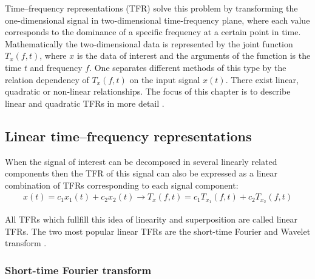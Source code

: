 Time–frequency representations (TFR) solve this problem by transforming the one-dimensional signal in two-dimensional time-frequency plane, where each value corresponds to the dominance of a specific frequency at a certain point in time. Mathematically the two-dimensional data is represented by the joint function $T_{x}(f,t)$, where $x$ is the data of interest and the arguments of the function is the time  $t$ and frequency  $f$. One separates different methods of this type by the relation dependency of $T_{x}(f,t)$ on the input signal $x(t)$. There exist linear, quadratic or non-linear relationships. The focus of this chapter is to describe linear and quadratic TFRs in more detail \cite{Hlawatsch1992}. 

\subsection{Linear time–frequency representations}
When the signal of interest can be decomposed in several linearly related components then the TFR of this signal can also be expressed as a linear combination of TFRs corresponding to each signal component:
\begin{equation}
    \begin{aligned}
        x(t) = c_{1} x_{1}(t) + c_{2} x_{2}(t) \rightarrow T_{x}(f,t) = c_{1} T_{x_{1}}(f,t) + c_{2} T_{x_{2}}(f,t)
    \end{aligned}
\end{equation}


All TFRs which fullfill this idea of linearity and superposition are called linear TFRs. The two most popular linear TFRs are the short-time Fourier and Wavelet transform \cite{Hlawatsch1992}. 
\subsubsection{Short-time Fourier transform}

